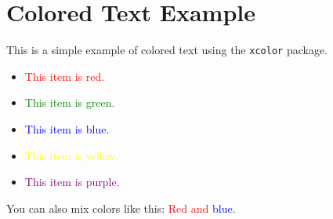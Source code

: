 \documentclass{article}
\begin{document}
\section*{Colored Text Example}

This is a simple example of colored text using the \texttt{xcolor} package.

\begin{itemize}
    \item \textcolor{red}{This item is red.}
    \item \textcolor{green}{This item is green.}
    \item \textcolor{blue}{This item is blue.}
    \item \textcolor{yellow}{This item is yellow.}
    \item \textcolor{purple}{This item is purple.}
\end{itemize}

You can also mix colors like this: \textcolor{red}{Red and \textcolor{blue}{blue}}.
\end{document}
